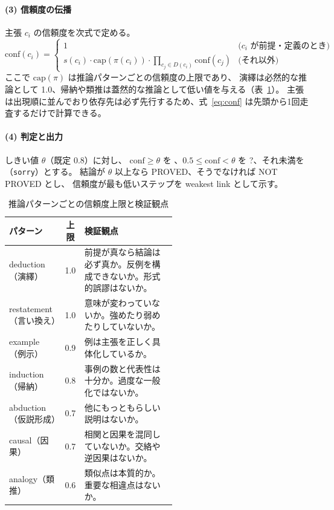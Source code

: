 \documentclass[a4paper,11pt]{ltjsarticle}
\newcommand{\okmark}{\ding{51}}
\newcommand{\ngmark}{\ding{55}}
\begin{document}
\paragraph{(3) 信頼度の伝播}
主張 $c_i$ の信頼度を次式で定める。
\begin{equation}
  \mathrm{conf}(c_i) =
  \begin{cases}
    1 & \text{($c_i$ が前提・定義のとき)} \\
    s(c_i) \cdot \mathrm{cap}(\pi(c_i)) \cdot \displaystyle\prod_{c_j \in D(c_i)} \mathrm{conf}(c_j) & \text{(それ以外)}
  \end{cases}
  \label{eq:conf}
\end{equation}
ここで $\mathrm{cap}(\pi)$ は推論パターンごとの信頼度の上限であり、
演繹は必然的な推論として 1.0、帰納や類推は蓋然的な推論として低い値を与える（表~\ref{tab:pattern}）。
主張は出現順に並んでおり依存先は必ず先行するため、式~\eqref{eq:conf} は先頭から1回走査するだけで計算できる。

\paragraph{(4) 判定と出力}
しきい値 $\theta$（既定 0.8）に対し、
$\mathrm{conf} \geq \theta$ を \okmark{}、$0.5 \leq \mathrm{conf} < \theta$ を ?、それ未満を \ngmark{}（\texttt{sorry}）とする。
結論が $\theta$ 以上なら PROVED、そうでなければ NOT PROVED とし、
信頼度が最も低いステップを weakest link として示す。

\begin{table}[t]
  \centering
  \caption{推論パターンごとの信頼度上限と検証観点}
  \label{tab:pattern}
  \small
  \begin{tabular}{lcp{0.55\linewidth}}
    \toprule
    パターン & 上限 & 検証観点 \\
    \midrule
    deduction（演繹） & 1.0 & 前提が真なら結論は必ず真か。反例を構成できないか。形式的誤謬はないか。 \\
    restatement（言い換え） & 1.0 & 意味が変わっていないか。強めたり弱めたりしていないか。 \\
    example（例示） & 0.9 & 例は主張を正しく具体化しているか。 \\
    induction（帰納） & 0.8 & 事例の数と代表性は十分か。過度な一般化ではないか。 \\
    abduction（仮説形成） & 0.7 & 他にもっともらしい説明はないか。 \\
    causal（因果） & 0.7 & 相関と因果を混同していないか。交絡や逆因果はないか。 \\
    analogy（類推） & 0.6 & 類似点は本質的か。重要な相違点はないか。 \\
    \bottomrule
  \end{tabular}
\end{table}
\end{document}
